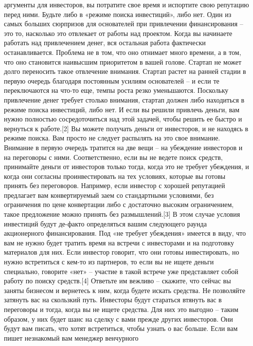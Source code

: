 \documentclass[ebook,12pt,oneside,openany]{memoir}
\begin{document}
аргументы для инвесторов, вы потратите свое время и испортите свою
репутацию перед ними. Будьте либо в «режиме поиска инвестиций», либо
нет. Один из самых больших сюрпризов для основателей при привлечении
финансирования – это то, насколько это отвлекает от работы над
проектом. Когда вы начинаете работать над привлечением денег, вся
остальная работа фактически останавливается. Проблема не в том, что
оно отнимает много времени, а в том, что оно становится наивысшим
приоритетом в вашей голове. Стартап не может долго переносить такое
отвлечение внимания. Стартап растет на ранней стадии в первую очередь
благодаря постоянным усилиям основателей – и если те переключаются на
что-то еще, темпы роста резко уменьшаются. Поскольку привлечение денег
требует столько внимания, стартап должен либо находиться в режиме
поиска инвестиций, либо нет. И если вы решили привлечь деньги, вам
нужно полностью сосредоточиться над этой задачей, чтобы решить ее
быстро и вернуться к работе.[2] Вы можете получать деньги от
инвесторов, и не находясь в режиме поиска. Вам просто не следует
распылять на это свое внимание. Внимание в первую очередь тратится на
две вещи – на убеждение инвесторов и на переговоры с ними.
Соответственно, если вы не ведете поиск средств, принимайте деньги от
инвесторов только тогда, когда это не требует убеждения, и когда они
согласны проинвестировать на тех условиях, которые вы готовы принять
без переговоров. Например, если инвестор с хорошей репутацией
предлагает вам конвертируемый заем со стандартными условиями, без
ограничения по цене конвертации либо с достаточно высоким
ограничением, такое предложение можно принять без размышлений.[3] В
этом случае условия инвестиций будут де-факто определяться вашим
следующего раунда акционерного финансирования. Под «не требует
убеждения» имеется в виду, что вам не нужно будет тратить время на
встречи с инвесторами и на подготовку материалов для них. Если
инвестор говорит, что они готовы инвестировать, но нужно встретиться с
кем-то из партнеров, то если вы не ищете деньги специально, говорите
«нет» – участие в такой встрече уже представляет собой работу по
поиску средств.[4] Ответьте им вежливо – скажите, что сейчас вы заняты
бизнесом и вернетесь к ним, когда будете искать средства. Не
позволяйте затянуть вас на скользкий путь. Инвесторы будут стараться
втянуть вас в переговоры и тогда, когда вы не ищете средства. Для них
это выгодно – таким образом, у них будет шанс на сделку с вами прежде
других инвесторов. Они будут вам писать, что хотят встретиться, чтобы
узнать о вас больше. Если вам пишет незнакомый вам менеджер венчурного
\end{document}

